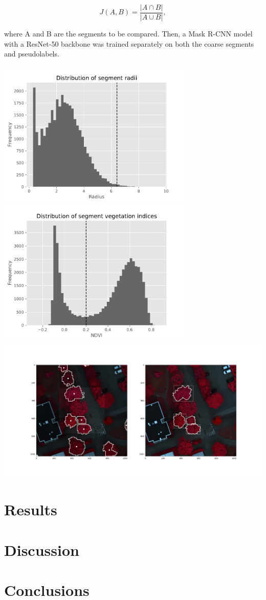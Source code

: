 \documentclass[english, 12pt, a4paper, sci, utf8, a-2b, online]{aaltothesis}
\begin{document}
$$
J(A, B) = \frac{|A \cap B|}{|A \cup B |},
$$

where A and B are the segments to be compared. Then, a Mask R-CNN model with a ResNet-50 \cite{resnet} backbone was trained separately on both the coarse segments and pseudolabels.

\begin{center}
\includegraphics[width=0.7\textwidth]{figures/radii.pdf}
\includegraphics[width=0.7\textwidth]{figures/ndvi.pdf}
\includegraphics[width=1.0\textwidth]{figures/pseudolabel-example.png}
\end{center}

\section{Results}

\section{Discussion}

\section{Conclusions}

\clearpage

\thesisbibliography


\end{document}
